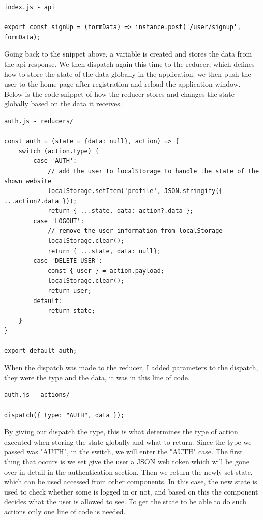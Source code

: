 \begin{verbatim}
index.js - api

export const signUp = (formData) => instance.post('/user/signup', formData);
\end{verbatim}

Going back to the snippet above, a variable is created and stores the data from the api response. We then dispatch again this time to the reducer, which defines how to store the state of the data globally in the application. we then push the user to the home page after registration and reload the application window. Below is the code snippet of how the reducer stores and changes the state globally based on the data it receives.

\begin{verbatim}
auth.js - reducers/

const auth = (state = {data: null}, action) => {
    switch (action.type) {
        case 'AUTH':
            // add the user to localStorage to handle the state of the shown website
            localStorage.setItem('profile', JSON.stringify({ ...action?.data }));
            return { ...state, data: action?.data };
        case 'LOGOUT':
            // remove the user information from localStorage
            localStorage.clear();
            return { ...state, data: null};
        case 'DELETE_USER':
            const { user } = action.payload;
            localStorage.clear();
            return user;
        default:
            return state;
    }
}

export default auth;
\end{verbatim}

When the dispatch was made to the reducer, I added parameters to the dispatch, they were the type and the data, it was in this line of code.

\begin{verbatim}
auth.js - actions/

dispatch({ type: "AUTH", data });
\end{verbatim}

By giving our dispatch the type, this is what determines the type of action executed when storing the state globally and what to return. Since the type we passed was "AUTH", in the switch, we will enter the "AUTH" case. The first thing that occurs is we set give the user a JSON web token which will be gone over in detail in the authentication section. Then we return the newly set state, which can be used accessed from other components. In this case, the new state is used to check whether some is logged in or not, and based on this the component decides what the user is allowed to see. To get the state to be able to do such actions only one line of code is needed. 

